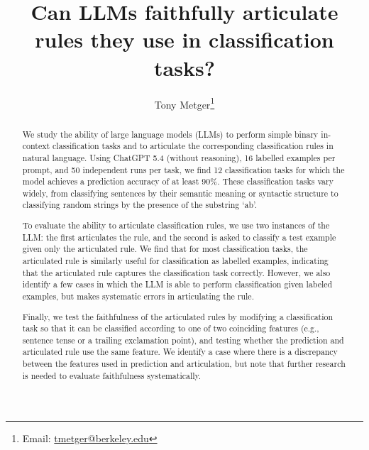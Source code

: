 \documentclass[11pt, letterpaper]{article}
\begin{document}
\title{Can LLMs faithfully articulate rules they use in classification tasks?}

\author[1]{Tony Metger\footnote{Email: \href{mailto:tmetger@berkeley.edu}{tmetger@berkeley.edu}}}
\date{\vspace{-1cm}}

\maketitle

\begin{abstract}
    We study the ability of large language models (LLMs) to perform simple binary in-context classification tasks and to articulate the corresponding classification rules in natural language.
    Using ChatGPT 5.4 (without reasoning), 16 labelled examples per prompt, and 50 independent runs per task, we find 12 classification tasks for which the model achieves a prediction accuracy of at least $90\%$.
    These classification tasks vary widely, from classifying sentences by their semantic meaning or syntactic structure to classifying random strings by the presence of the substring `ab'.

    To evaluate the ability to articulate classification rules, we use two instances of the LLM: the first articulates the rule, and the second is asked to classify a test example given only the articulated rule.
    We find that for most classification tasks, the articulated rule is similarly useful for classification as labelled examples, indicating that the articulated rule captures the classification task correctly.
    However, we also identify a few cases in which the LLM is able to perform classification given labeled examples, but makes systematic errors in articulating the rule.
    
    Finally, we test the faithfulness of the articulated rules by modifying a classification task so that it can be classified according to one of two coinciding features (e.g., sentence tense or a trailing exclamation point), and testing whether the prediction and articulated rule use the same feature.
    We identify a case where there is a discrepancy between the features used in prediction and articulation, but note that further research is needed to evaluate faithfulness systematically.
    
\end{abstract}
\end{document}
